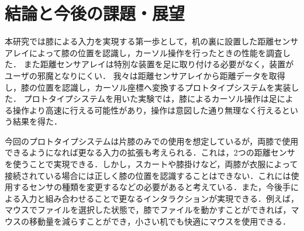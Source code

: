 \documentclass[submit, techrep]{ipsj}
\begin{document}
\section{結論と今後の課題・展望}
本研究では膝による入力を実現する第一歩として，机の裏に設置した距離センサアレイによって膝の位置を認識し，カーソル操作を行ったときの性能を調査した．
また距離センサアレイは特別な装置を足に取り付ける必要がなく，装置がユーザの邪魔となりにくい．
我々は距離センサアレイから距離データを取得し，膝の位置を認識し，カーソル座標へ変換するプロトタイプシステムを実装した．
プロトタイプシステムを用いた実験では，膝によるカーソル操作は足による操作より高速に行える可能性があり，操作は意図した通り無理なく行えるという結果を得た．\par
今回のプロトタイプシステムは片膝のみでの使用を想定しているが，両膝で使用できるようになれば更なる入力の拡張も考えられる．これは，2つの距離センサを使うことで実現できる．しかし，スカートや膝掛けなど，両膝が衣服によって接続されている場合には正しく膝の位置を認識することはできない．これには使用するセンサの種類を変更するなどの必要があると考えている．また，今後手による入力と組み合わせることで更なるインタラクションが実現できる．例えば，マウスでファイルを選択した状態で，膝でファイルを動かすことができれば，マウスの移動量を減らすことができ，小さい机でも快適にマウスを使用できる．


%
%
%




\begin{biography}
%
%
\end{biography}
\end{document}
